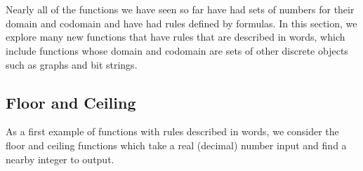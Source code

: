 \section{\secfnwords}
\label{sec_fn_words}

Nearly all of the functions we have seen so far have had sets of numbers for their domain and codomain and have had rules defined by formulas.  In this section, we explore many new functions that have rules that are described in words, which include functions whose domain and codomain are sets of other discrete objects such as graphs and bit strings. 


\newcommand{\subfloorceiling}{Floor and Ceiling}
\subsection{\subfloorceiling}
\label{sub_floor_ceiling}

As a first example of functions with rules described in words, we consider the floor and ceiling functions which take a real (decimal) number input and find a nearby integer to output.  
 
